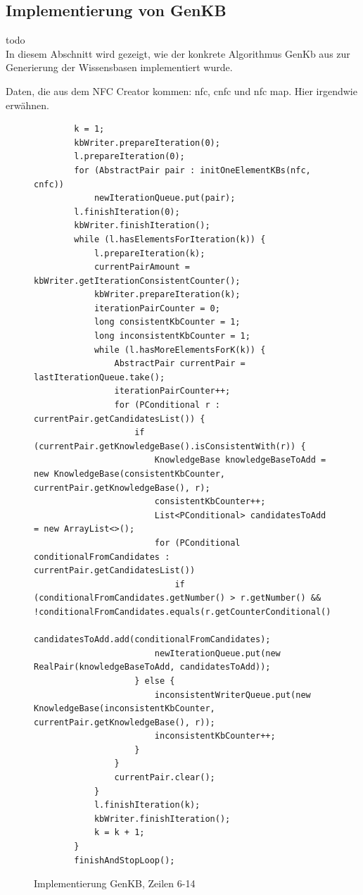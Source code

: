 \documentclass[12pt,a4paper]{article}
\begin{document}
\subsection{Implementierung von GenKB}
todo \\

In diesem Abschnitt wird gezeigt, wie der konkrete Algorithmus GenKb aus \cite{beierle19} zur Generierung der Wissensbasen implementiert wurde.

Daten, die aus dem NFC Creator kommen: nfc, cnfc und nfc map. Hier irgendwie erwähnen. \\

\begin{figure}


\begin{lstlisting}
        k = 1;
        kbWriter.prepareIteration(0); 
        l.prepareIteration(0);
        for (AbstractPair pair : initOneElementKBs(nfc, cnfc))
            newIterationQueue.put(pair);
        l.finishIteration(0);
        kbWriter.finishIteration();
        while (l.hasElementsForIteration(k)) {
            l.prepareIteration(k);
            currentPairAmount = kbWriter.getIterationConsistentCounter();
            kbWriter.prepareIteration(k);
            iterationPairCounter = 0;
            long consistentKbCounter = 1;
            long inconsistentKbCounter = 1;
            while (l.hasMoreElementsForK(k)) {
                AbstractPair currentPair = lastIterationQueue.take();
                iterationPairCounter++;
                for (PConditional r : currentPair.getCandidatesList()) {
                    if (currentPair.getKnowledgeBase().isConsistentWith(r)) {
                        KnowledgeBase knowledgeBaseToAdd = new KnowledgeBase(consistentKbCounter, currentPair.getKnowledgeBase(), r);
                        consistentKbCounter++;
                        List<PConditional> candidatesToAdd = new ArrayList<>();
                        for (PConditional conditionalFromCandidates : currentPair.getCandidatesList())
                            if (conditionalFromCandidates.getNumber() > r.getNumber() && !conditionalFromCandidates.equals(r.getCounterConditional()))
                                candidatesToAdd.add(conditionalFromCandidates);
                        newIterationQueue.put(new RealPair(knowledgeBaseToAdd, candidatesToAdd));
                    } else {
                        inconsistentWriterQueue.put(new KnowledgeBase(inconsistentKbCounter, currentPair.getKnowledgeBase(), r));
                        inconsistentKbCounter++;
                    }
                }
                currentPair.clear();
            }
            l.finishIteration(k);
            kbWriter.finishIteration();
            k = k + 1;
        }
        finishAndStopLoop();
\end{lstlisting}
\caption{Implementierung GenKB, Zeilen 6-14}
\end{figure}
\end{document}
